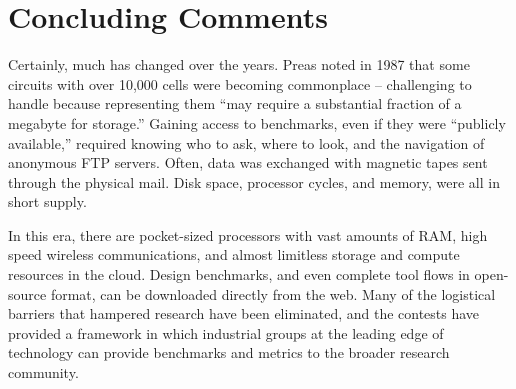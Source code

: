 \documentclass[sigconf]{acmart}
\begin{document}
\iffalse

Striking a balance between objectives.  Industry groups
would certainly like a production-ready tool, but this is
something that a small team of graduate students can't
build quickly.

Need to capture the essence of a problem, while keeping it
tractable.  Make the benchmark hard to game, so that solutions
actually resemble what we might want ``in practice.''

Trade-off on using library for parsing -- locks into a build
system, sometimes a language and set of tools.  Simple
file formats, by contrast, may lose the essential elements
that matter for an industrial design.

Evaluators, with painstaking detail, are important.

Complex tool flows for evaluation are trouble.

\fi








\section{Concluding Comments}

Certainly, much has changed over the years.  Preas\cite{Preas87} noted
in 1987 that some circuits with over 10,000 cells were becoming
commonplace -- challenging to handle because representing them ``may
require a substantial fraction of a megabyte for storage.''
Gaining access to benchmarks, even if they
were ``publicly available,'' required knowing who to ask, where to
look, and the navigation of anonymous FTP servers. Often, data
was exchanged with magnetic tapes sent through the physical mail.
Disk space, processor cycles, and memory, were all in short supply.

In this era, there are pocket-sized processors with
vast amounts of RAM, high speed wireless communications, and almost
limitless storage and compute resources in the cloud.
Design benchmarks, and even complete tool flows in open-source
format, can be downloaded directly from the web.
Many of the logistical barriers that hampered research have been
eliminated, and the contests have provided a framework in which
industrial groups at the leading edge of technology can provide
benchmarks and metrics to the broader research community.
\end{document}
